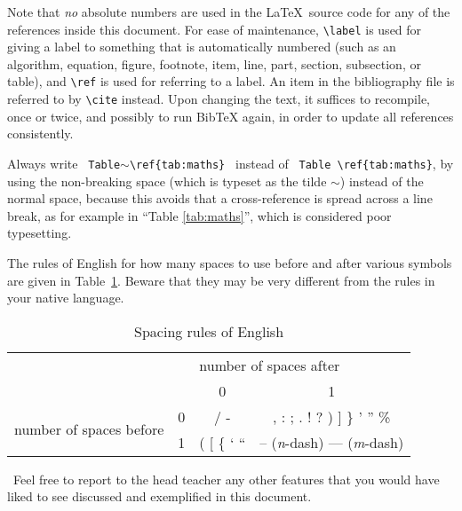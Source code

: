 Note that \emph{no} absolute numbers are used in the \LaTeX\ source
code for any of the references inside this document.  For ease of
maintenance, \verb|\label| is used for giving a label to something
that is automatically numbered (such as an algorithm, equation,
figure, footnote, item, line, part, section, subsection, or table),
and \verb|\ref| is used for referring to a label.  An item in the
bibliography file is referred to by \verb|\cite| instead.  Upon
changing the text, it suffices to recompile, once or twice, and
possibly to run BibTeX again, in order to update all references
consistently.

Always write
%
\verb| Table|$\sim$\verb|\ref{tab:maths} |
%
instead of
%
\verb| Table \ref{tab:maths}|,
%
by using the non-breaking space (which is typeset as the tilde $\sim$)
instead of the normal space, because this avoids that a
cross-reference is spread across a line break, as for example in
``Table \ref{tab:maths}'', which is considered poor typesetting.

The rules of English for how many spaces to use before and after
various symbols are given in Table~\ref{tab:spacing}.  Beware that
they may be very different from the rules in your native language.

\begin{table}[t]
  \centering
  \begin{tabular}{cc|c|c}
    \toprule
    \multicolumn{2}{c}{} & \multicolumn{2}{l}{number of spaces after} \\
    \cmidrule{3-4}
    \multicolumn{2}{c}{} & 0 & 1 \\
    \midrule
    \multirow{2}{*}{number of spaces before} & 0 & / - & , : ; . ! ?
    ) ] \} ' '' \% \\
    \cmidrule{2-4}
    & 1 & ( [ \{ ` `` & -- (\emph{n}-dash) --- (\emph{m}-dash) \\
    \bottomrule
  \end{tabular}
  \caption{Spacing rules of English}
  \label{tab:spacing}
\end{table}

\vfill

\noindent
\handpoint\ Feel free to report to the head teacher any other features
that you would have liked to see discussed and exemplified in this
document.
